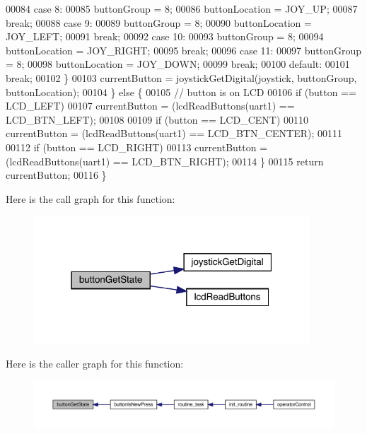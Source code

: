 \begin{DoxyCode}
00084     \textcolor{keywordflow}{case} 8:
00085       buttonGroup = 8;
00086       buttonLocation = JOY\_UP;
00087       \textcolor{keywordflow}{break};
00088     \textcolor{keywordflow}{case} 9:
00089       buttonGroup = 8;
00090       buttonLocation = JOY\_LEFT;
00091       \textcolor{keywordflow}{break};
00092     \textcolor{keywordflow}{case} 10:
00093       buttonGroup = 8;
00094       buttonLocation = JOY\_RIGHT;
00095       \textcolor{keywordflow}{break};
00096     \textcolor{keywordflow}{case} 11:
00097       buttonGroup = 8;
00098       buttonLocation = JOY\_DOWN;
00099       \textcolor{keywordflow}{break};
00100     \textcolor{keywordflow}{default}:
00101       \textcolor{keywordflow}{break};
00102     \}
00103     currentButton = joystickGetDigital(joystick, buttonGroup, buttonLocation);
00104   \} \textcolor{keywordflow}{else} \{
00105     \textcolor{comment}{// button is on LCD}
00106     \textcolor{keywordflow}{if} (button == LCD_LEFT)
00107       currentButton = (lcdReadButtons(uart1) == LCD\_BTN\_LEFT);
00108 
00109     \textcolor{keywordflow}{if} (button == LCD_CENT)
00110       currentButton = (lcdReadButtons(uart1) == LCD\_BTN\_CENTER);
00111 
00112     \textcolor{keywordflow}{if} (button == LCD_RIGHT)
00113       currentButton = (lcdReadButtons(uart1) == LCD\_BTN\_RIGHT);
00114   \}
00115   \textcolor{keywordflow}{return} currentButton;
00116 \}
\end{DoxyCode}
Here is the call graph for this function\+:
\nopagebreak
\begin{figure}[H]
\begin{center}
\leavevmode
\includegraphics[width=292pt]{toggle_8h_a72989c21af9d14672f6e59c44a2b59bc_cgraph}
\end{center}
\end{figure}
Here is the caller graph for this function\+:
\nopagebreak
\begin{figure}[H]
\begin{center}
\leavevmode
\includegraphics[width=350pt]{toggle_8h_a72989c21af9d14672f6e59c44a2b59bc_icgraph}
\end{center}
\end{figure}
\mbox{\label{toggle_8h_a2b3d226371575c894979ab84bce95626}} 
